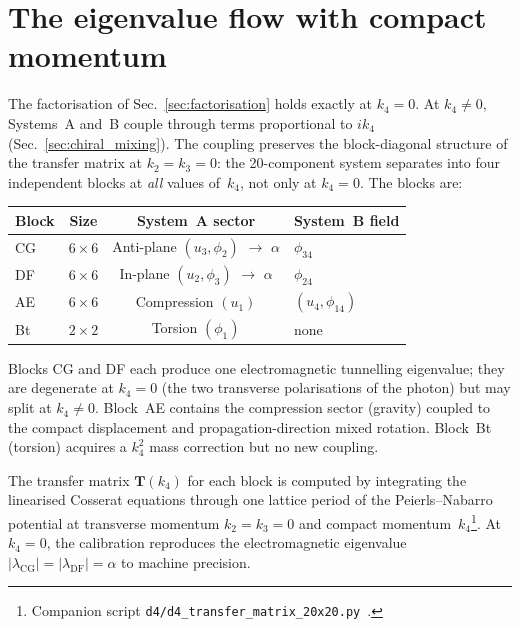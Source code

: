
\section{The eigenvalue flow with compact momentum}
\label{sec:eigenvalue_flow}

The factorisation of Sec.~\ref{sec:factorisation} holds exactly at $k_4 = 0$.  At $k_4 \neq 0$, Systems~A and~B couple through terms proportional to $ik_4$ (Sec.~\ref{sec:chiral_mixing}).  The coupling preserves the block-diagonal structure of the transfer matrix at $k_2 = k_3 = 0$: the 20-component system separates into four independent blocks at \textit{all} values of~$k_4$, not only at $k_4 = 0$.  The blocks are:
\begin{center}
\small
\begin{tabular}{lccl}
\toprule
\textbf{Block} & \textbf{Size} & \textbf{System~A sector} & \textbf{System~B field} \\
\midrule
CG & $6 \times 6$ & Anti-plane $(u_3, \phi_2)$ $\to$ $\alpha$ & $\phi_{34}$ \\
DF & $6 \times 6$ & In-plane $(u_2, \phi_3)$ $\to$ $\alpha$ & $\phi_{24}$ \\
AE & $6 \times 6$ & Compression $(u_1)$ & $(u_4, \phi_{14})$ \\
Bt & $2 \times 2$ & Torsion $(\phi_1)$ & none \\
\bottomrule
\end{tabular}
\end{center}
Blocks CG and DF each produce one electromagnetic tunnelling eigenvalue; they are degenerate at $k_4 = 0$ (the two transverse polarisations of the photon) but may split at $k_4 \neq 0$.  Block~AE contains the compression sector (gravity) coupled to the compact displacement and propagation-direction mixed rotation.  Block~Bt (torsion) acquires a $k_4^2$ mass correction but no new coupling.

The transfer matrix $\mathbf{T}(k_4)$ for each block is computed by integrating the linearised Cosserat equations through one lattice period of the Peierls--Nabarro potential at transverse momentum $k_2 = k_3 = 0$ and compact momentum~$k_4$\footnote{Companion script \texttt{d4/d4\_transfer\_matrix\_20x20.py}~\cite{CoxGitHub}.}.  At $k_4 = 0$, the calibration reproduces the electromagnetic eigenvalue $|\lambda_{\text{CG}}| = |\lambda_{\text{DF}}| = \alpha$ to machine precision.

